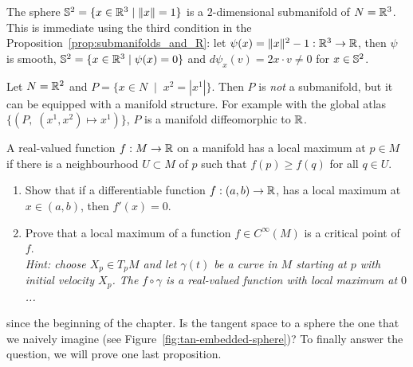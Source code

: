 \begin{example}\label{ex:s2}
  The sphere $\mathbb{S}^2 = \{x\in\mathbb{R}^3 \mid \|x\| = 1\}$ is a $2$-dimensional submanifold of $N=\mathbb{R}^3$.
  This is immediate using the third condition in the Proposition~\ref{prop:submanifolds_and_R}: let $\psi(x) = \|x\|^2 -1 : \mathbb{R}^3 \to \mathbb{R}$, then $\psi$ is smooth, $\mathbb{S}^2 = \{x\in\mathbb{R}^3\mid\psi(x)=0\}$ and $d\psi_x(v)= 2x\cdot v \neq 0$ for $x\in\mathbb{S}^2$.
\end{example}

\begin{example}
  Let $N = \mathbb{R}^2$ and $P = \{ x\in N \;\mid\; x^2 = |x^1| \}$.
  Then $P$ is \emph{not} a submanifold, but it can be equipped with a manifold structure.
  For example with the global atlas $\{(P,\; (x^1,x^2)\mapsto x^1)\}$, $P$ is a manifold diffeomorphic to $\mathbb{R}$.
\end{example}

\begin{exercise}
  A real-valued function $f:M\to\mathbb{R}$ on a manifold has a local maximum at $p\in M$ if there is a neighbourhood $U\subset M$ of $p$ such that $f(p) \geq f(q)$ for all $q\in U$.
  \begin{enumerate}
    \item Show that if a differentiable function $f:(a,b)\to\mathbb{R}$, has a local maximum at $x\in (a,b)$, then $f'(x) = 0$.
    \item Prove that a local maximum of a function $f\in C^\infty(M)$ is a critical point of $f$.\\
    \textit{\small Hint: choose $X_p\in T_pM$ and let $\gamma(t)$ be a curve in $M$ starting at $p$ with initial velocity $X_p$. The $f\circ \gamma$ is a real-valued function with local maximum at $0$...}
  \end{enumerate}
\end{exercise}

 since the beginning of the chapter.
Is the tangent space to a sphere the one that we naively imagine (see Figure~\ref{fig:tan-embedded-sphere})?
To finally answer the question, we will prove one last proposition.

